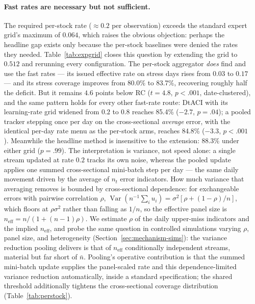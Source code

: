 \paragraph{Fast rates are necessary but not sufficient.} The required
per-stock rate ($\approx 0.2$ per observation) exceeds the standard
expert grid's maximum of $0.064$, which raises the obvious objection:
perhaps the headline gap exists only because the per-stock baselines
were denied the rates they needed. Table~\ref{tab:expgrid} closes this
question by extending the grid to $0.512$ and rerunning every
configuration. The per-stock aggregator \emph{does} find and use the
fast rates --- its issued effective rate on stress days rises from
$0.03$ to $0.17$ --- and its stress coverage improves from 80.0\% to
83.7\%, recovering roughly half the deficit. But it remains $4.6$
points below RC ($t = 4.8$, $p < .001$, date-clustered), and the same
pattern holds for every other fast-rate route: DtACI with its
learning-rate grid widened from $0.2$ to $0.8$ reaches 85.4\%
($-2.7$, $p = .04$); a pooled tracker stepping once per day on the
cross-sectional \emph{average} error, with the identical per-day rate
menu as the per-stock arms, reaches 84.8\% ($-3.3$, $p < .001$).
Meanwhile the headline method is insensitive to the extension: 88.3\%
under either grid ($p = .99$). The interpretation is variance, not
speed alone: a single stream updated at rate $0.2$ tracks its own
noise, whereas the pooled update applies one summed cross-sectional
mini-batch step per day --- the same daily movement driven by the
average of $n_t$ error indicators. How much variance that averaging
removes is bounded by cross-sectional dependence: for exchangeable
errors with pairwise correlation $\rho$,
$\operatorname{Var}(n^{-1}\sum_i u_i) = \sigma^2[\rho + (1-\rho)/n]$,
which floors at $\rho\sigma^2$ rather than falling as $1/n$, so the
effective panel size is $n_{\mathrm{eff}} = n / (1 + (n-1)\rho)$. We
estimate $\rho$ of the daily upper-miss indicators and the implied
$n_{\mathrm{eff}}$, and probe the same question in controlled
simulations varying $\rho$, panel size, and heterogeneity
(Section~\ref{sec:mechanism-sims}): the variance reduction pooling
delivers is that of $n_{\mathrm{eff}}$ conditionally independent
streams, material but far short of $\bar n$. Pooling's operative
contribution is that the summed mini-batch update supplies the
panel-scaled rate and this dependence-limited variance reduction
automatically, inside a standard specification; the shared threshold
additionally tightens the cross-sectional coverage distribution
(Table~\ref{tab:perstock}).


